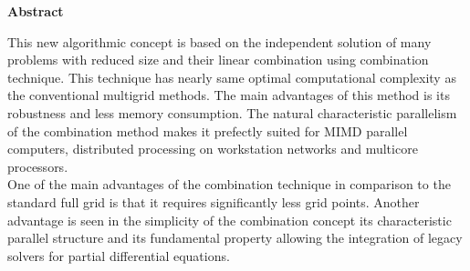 

\clearemptydoublepage
{}
{}	


\vspace*{2cm}
\begin{center}
{\Large \bf Abstract}
\end{center}
\vspace{1cm}

This new algorithmic concept is based on the independent solution of many problems with reduced size and their linear combination using combination technique\cite{Griebel1992}. This technique has nearly same optimal computational complexity as the conventional multigrid methods. The main advantages of this method is its robustness and less memory consumption. The natural characteristic parallelism of the combination method makes it prefectly suited for MIMD parallel computers, distributed processing on workstation networks and multicore processors.\cite{Griebel1992}\\ 

One of the main advantages of the combination technique in comparison to the standard full grid is that it requires significantly less grid points. Another advantage is seen in the simplicity of the combination concept its characteristic parallel structure and its fundamental property allowing the integration of legacy solvers for partial differential equations.\cite{Bungartz1994}\\

